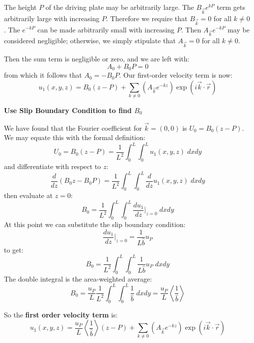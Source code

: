 \documentclass[12pt, a4paper, twoside, openright]{book}
\begin{document}
The height $P$ of the driving plate may be arbitrarily large.  The $B_{\vec{k}} e^{kP}$ term gets arbitrarily large with increasing $P$.  Therefore we require that $B_{\vec{k}} = 0$ for all $k \neq 0$.  The $e^{-kP}$ can be made arbitrarily small with increasing $P$.  Then $A_{\vec{k}} e^{-kP}$ may be considered negligible; otherwise, we simply stipulate that $A_{\vec{k}} = 0$ for all $k \neq 0$.

Then the sum term is negligible or zero, and we are left with:
\begin{equation}
A_0 + B_0 P = 0
\end{equation}
from which it follows that $A_0 = - B_0 P $.  Our first-order velocity term is now:
\begin{equation}
u_1(x,y,z) =  B_0 (z - P) + \sum_{k \neq 0} 
\left(  A_{\vec{k}} e^{-kz} \right)
\exp(i \vec{k}\cdot \vec{r})
\end{equation}

\textbf{Use Slip Boundary Condition to find $B_0$}

We have found that the Fourier coefficient for $\vec{k} = (0,0)$ is $U_0 = B_0 (z - P)$.
We may equate this with the formal definition:
\begin{equation}
U_0 = B_0 (z - P) = \frac{1}{L^2} \int_0^L \int_0^L u_1(x,y,z) \;dxdy
\end{equation}
and differentiate with respect to $z$:
\begin{equation}
\frac{d}{dz} ( B_0 z - B_0 P) = \frac{1}{L^2} \int_0^L \int_0^L \frac{d}{dz} u_1(x,y,z) \;dxdy
\end{equation}
then evaluate at $z=0$:
\begin{equation}
B_0 = \frac{1}{L^2} \int_0^L \int_0^L \frac{d u_1}{dz} \rvert_{z=0} \;dxdy
\end{equation}
At this point we can substitute the slip boundary condition:
\begin{equation}
\frac{d u_1}{d z} \rvert_{z=0} = \frac{1}{L \hat{b}} u_P
\end{equation}
to get:
\begin{equation}
B_0 = \frac{1}{L^2} \int_0^L \int_0^L \frac{1}{L \hat{b}} u_P \;dxdy
\end{equation}
The double integral is the area-weighted average:
\begin{equation}
B_0 = \frac{u_P}{L} \frac{1}{L^2} \int_0^L \int_0^L \frac{1}{\hat{b}} \;dxdy
= \frac{u_P}{L} \left< \frac{1}{\hat{b}} \right>
\end{equation}

\vspace{1em}
So the \textbf{first order velocity term} is:
\begin{equation}
u_1(x,y,z) =  \frac{u_P}{L} \left< \frac{1}{\hat{b}} \right> (z - P)
 + \sum_{k \neq 0} 
\left(  A_{\vec{k}} e^{-kz} \right)
\exp(i \vec{k}\cdot \vec{r})
\end{equation}
\end{document}

